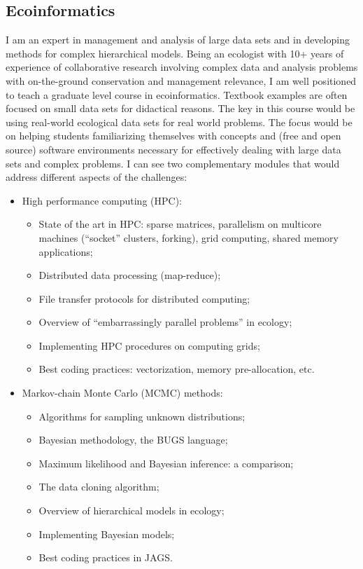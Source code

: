 \subsection{Ecoinformatics}
I am an expert in management and analysis of large data sets and in developing methods for complex hierarchical models. Being an ecologist with 10+ years of experience of collaborative research involving complex data and analysis problems with on-the-ground conservation and management relevance, I am well positioned to teach a graduate level course in ecoinformatics.
Textbook examples are often focused on small data sets for didactical reasons. The key in this course would be using real-world ecological data sets for real world problems. The focus would be on helping students familiarizing themselves with concepts and (free and open source) software environments necessary for effectively dealing with large data sets and complex problems. I can see two complementary modules that would address different aspects of the challenges:
\vspace{0.3pc}

\begin{itemize}%
\item High performance computing (HPC):
\begin{itemize}%
  \item State of the art in HPC: sparse matrices, parallelism on multicore machines (``socket'' clusters, forking), grid computing, shared memory applications;
  \item Distributed data processing (map-reduce);
  \item File transfer protocols for distributed computing;
  \item Overview of ``embarrassingly parallel problems'' in ecology;
  \item Implementing HPC procedures on computing grids;
  \item Best coding practices: vectorization, memory pre-allocation, etc.
\end{itemize}%
\item Markov-chain Monte Carlo (MCMC) methods:
\begin{itemize}%
  \item Algorithms for sampling unknown distributions; 
  \item Bayesian methodology, the BUGS language;
  \item Maximum likelihood and Bayesian inference: a comparison;
  \item The data cloning algorithm;
  \item Overview of hierarchical models in ecology;
  \item Implementing Bayesian models;
  \item Best coding practices in JAGS.
\end{itemize}%
\end{itemize}%
\vspace{0.5pc}

